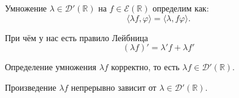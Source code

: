 \begin{to_def}
	Умножение $\lambda \in \mathcal{D}'(\mathbb{R})$ на $f \in \mathcal{E}(\mathbb{R})$ определим как:
	\begin{equation*}
		\langle \lambda f, \varphi\rangle = \langle \lambda, f \varphi\rangle.
	\end{equation*}
\end{to_def}
При чём у нас есть правило Лейбница \begin{equation*}
		(\lambda f)' = \lambda' f + \lambda f'
\end{equation*}

\begin{to_lem}
	Определение умножения $\lambda f$ корректно, то есть $\lambda f \in \mathcal{D}'(\mathbb{R})$.
\end{to_lem}

\begin{to_lem}
	Произведение $\lambda f$ непрерывно зависит от $\lambda \in \mathcal{D}'(\mathbb{R})$.
\end{to_lem}